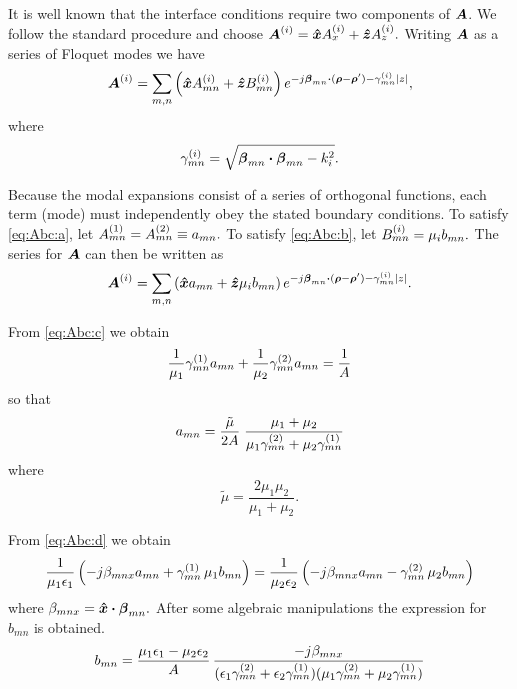 It is well known that the interface conditions require two components
of $\boldsymbol{A}$.  We follow the standard procedure and choose $\boldsymbol{A}^{(i)} = \boldsymbol{\hat{x}}
A^{(i)}_x + \boldsymbol{\hat{z}} A^{(i)}_z.$  Writing $\boldsymbol{A}$ as a series of Floquet modes we
have 
\begin{equation}
  \label{eq:Afloquet1}
  \boldsymbol{A}^{(i)} = \sum_{m,n} 
  \left(
    \boldsymbol{\hat{x}} A^{(i)}_{mn} + \boldsymbol{\hat{z}} B^{(i)}_{mn}
  \right)
  e^{-j\boldsymbol{\beta}_{mn} \boldsymbol{\cdot} (\boldsymbol{\rho}-\boldsymbol{\rho}') - \gamma^{(i)}_{mn} \lvert z\rvert},
\end{equation}
where
\begin{equation}
  \label{eq:gamma}
  \gamma^{(i)}_{mn} = \sqrt{\boldsymbol{\beta}_{mn} \boldsymbol{\cdot} \boldsymbol{\beta}_{mn} - k_i^2}.
\end{equation}

Because the modal expansions consist of a series of orthogonal
functions, each term
(mode) must independently obey the stated boundary conditions.
To satisfy \eqref{eq:Abc:a}, let $A^{(1)}_{mn} = A^{(2)}_{mn} \equiv
a_{mn}.$  To satisfy \eqref{eq:Abc:b}, let $B^{(i)}_{mn} = \mu_i
b_{mn}.$  The series for $\boldsymbol{A}$ can then be written as 
\begin{equation}
  \label{eq:Afloquet2}
  \boldsymbol{A}^{(i)} = \sum_{m,n} 
  \left(
    \boldsymbol{\hat{x}} a_{mn} + \boldsymbol{\hat{z}} \mu_i b_{mn}
  \right)
  e^{-j\boldsymbol{\beta}_{mn} \boldsymbol{\cdot} (\boldsymbol{\rho}-\boldsymbol{\rho}') - \gamma^{(i)}_{mn} \lvert z\rvert}.
\end{equation}

From \eqref{eq:Abc:c} we obtain
\begin{equation*}
  \frac{1}{\mu_1} \gamma^{(1)}_{mn} a_{mn} + \frac{1}{\mu_2} \gamma^{(2)}_{mn}
  a_{mn} = \frac{1}{A}
\end{equation*}
so that
\begin{equation}
  \label{eq:amn}
  a_{mn} = \frac{\tilde{\mu}}{2A} \; \frac{\mu_1+\mu_2}{\mu_1
  \gamma^{(2)}_{mn} + \mu_2 \gamma^{(1)}_{mn}}
\end{equation}
where
\begin{equation}
  \tilde{\mu} = \frac{2\mu_1 \mu_2}{\mu_1 + \mu_2}.
\end{equation}

From \eqref{eq:Abc:d} we obtain
\begin{equation*}
  \frac{1}{\mu_1\epsilon_1} 
  \left( -j\beta_{mnx} a_{mn} + \gamma^{(1)}_{mn} \, \mu_1 b_{mn} \right)
  =
  \frac{1}{\mu_2\epsilon_2} 
  \left( -j\beta_{mnx} a_{mn} - \gamma^{(2)}_{mn} \, \mu_2 b_{mn} \right)
\end{equation*}
where $\beta_{mnx} = \boldsymbol{\hat{x}} \boldsymbol{\cdot} \boldsymbol{\beta}_{mn}.$
After some algebraic manipulations the expression for $b_{mn}$ is obtained.
\begin{equation}
  \label{eq:bmn}
  b_{mn} = \frac{\mu_1\epsilon_1 - \mu_2\epsilon_2}{A} \,
  \frac{-j\beta_{mnx}}{(\epsilon_1\gamma^{(2)}_{mn} + \epsilon_2\gamma^{(1)}_{mn})
     (\mu_1\gamma^{(2)}_{mn} + \mu_2\gamma^{(1)}_{mn})}
\end{equation}

